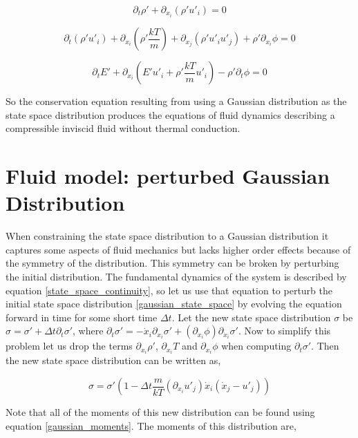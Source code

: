 \documentclass[%
 twocolumn,
 amsmath,amssymb,
 aps,
]{revtex4-1}
\begin{document}
\[
\partial_t \rho' + \partial_{x_i}\left(\rho'u'_i\right)=0
\]

\[
\partial_t \left(\rho' u'_i\right) + \partial_{x_i}\left(\rho'\frac{kT}{m}\right) + \partial_{x_j}\left(\rho'u'_iu'_j\right) + \rho'\partial_{x_i}\phi = 0
\]

\[
\partial_t E' + \partial_{x_i}\left(E'u'_i + \rho'\frac{kT}{m}u'_i\right)-\rho'\partial_t\phi = 0
\]

So the conservation equation resulting from using a Gaussian distribution as the state space distribution produces the equations of fluid dynamics describing a compressible inviscid fluid without thermal conduction.

\section{Fluid model: perturbed Gaussian Distribution}
When constraining the state space distribution to a Gaussian distribution it captures some aspects of fluid mechanics but lacks higher order effects because of the symmetry of the distribution. This symmetry can be broken by perturbing the initial distribution. The fundamental dynamics of the system is described by equation \eqref{state_space_continuity}, so let us use that equation to perturb the initial state space distribution \eqref{gaussian_state_space} by evolving the equation forward in time for some short time $\Delta t$. Let the new state space distribution $\sigma$ be $\sigma=\sigma' + \Delta t\partial_t \sigma'$, where $\partial_t \sigma'=-\dot{x}_i\partial_{x_i}\sigma'+\left(\partial_{x_i}\phi\right)\partial_{\dot{x}_i}\sigma'$. Now to simplify this problem let us drop the terms $\partial_{x_i}\rho'$, $\partial_{x_i}T$ and $\partial_{x_i}\phi$ when computing $\partial_t \sigma'$. Then the new state space distribution can be written as,

\begin{equation}
\sigma = \sigma'\left(1-\Delta t\frac{m}{kT}\left(\partial_{x_i}u'_j\right)\dot{x}_i\left(\dot{x}_j-u'_j\right)\right)
\label{perturbed_gaussian_distribution}
\end{equation}

Note that all of the moments of this new distribution can be found using equation \eqref{gaussian_moments}. The moments of this distribution are,
\end{document}
